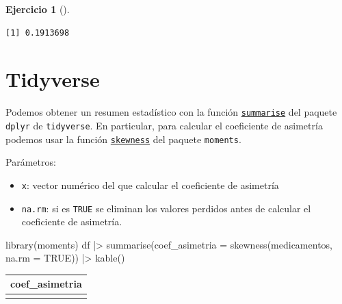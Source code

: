 \documentclass[
  a4paper,
]{scrreport}
\newenvironment{Shaded}{\begin{snugshade}}{\end{snugshade}}
\newcommand{\AttributeTok}[1]{\textcolor[rgb]{0.40,0.45,0.13}{#1}}
\newcommand{\ConstantTok}[1]{\textcolor[rgb]{0.56,0.35,0.01}{#1}}
\newcommand{\FunctionTok}[1]{\textcolor[rgb]{0.28,0.35,0.67}{#1}}
\newcommand{\NormalTok}[1]{\textcolor[rgb]{0.00,0.23,0.31}{#1}}
\newcommand{\SpecialCharTok}[1]{\textcolor[rgb]{0.37,0.37,0.37}{#1}}
\providecommand{\tightlist}{%
  \setlength{\itemsep}{0pt}\setlength{\parskip}{0pt}}\usepackage{longtable,booktabs,array}
\theoremstyle{definition}
\newtheorem{exercise}{Ejercicio}[chapter]
\theoremstyle{remark}
\begin{document}
\begin{exercise}[]
\begin{enumerate}
\begin{tcolorbox}
\begin{Shaded}
\end{Shaded}

\begin{verbatim}
[1] 0.1913698
\end{verbatim}

  \section{Tidyverse}

  Podemos obtener un resumen estadístico con la función
  \href{https://dplyr.tidyverse.org/reference/summarise.html}{\texttt{summarise}}
  del paquete \texttt{dplyr} de \texttt{tidyverse}. En particular, para
  calcular el coeficiente de asimetría podemos usar la función
  \href{https://www.rdocumentation.org/packages/moments/versions/0.14/topics/skewness}{\texttt{skewness}}
  del paquete \texttt{moments}.

  Parámetros:

  \begin{itemize}
  \tightlist
  \item
    \texttt{x}: vector numérico del que calcular el coeficiente de
    asimetría
  \item
    \texttt{na.rm}: si es \texttt{TRUE} se eliminan los valores perdidos
    antes de calcular el coeficiente de asimetría.
  \end{itemize}

\begin{Shaded}
\begin{Highlighting}[]
\FunctionTok{library}\NormalTok{(moments)}
\NormalTok{df }\SpecialCharTok{|\textgreater{}} \FunctionTok{summarise}\NormalTok{(}\AttributeTok{coef\_asimetria =} \FunctionTok{skewness}\NormalTok{(medicamentos, }\AttributeTok{na.rm =} \ConstantTok{TRUE}\NormalTok{)) }\SpecialCharTok{|\textgreater{}} 
    \FunctionTok{kable}\NormalTok{()}
\end{Highlighting}
\end{Shaded}

  \begin{longtable}[]{@{}r@{}}
  \toprule\noalign{}
  coef\_asimetria \\
  \midrule\noalign{}
  \endhead
  \bottomrule\noalign{}
  \endlastfoot
  0.1913698 \\
  \end{longtable}


\end{tcolorbox}
\end{enumerate}
\end{exercise}
\end{document}
